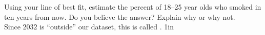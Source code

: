 \myWideProblem
{
    \small
    Using your line of best fit, estimate the percent of 18--25 year olds who smoked in ten years from now.
    Do you believe the answer? Explain why or why not.\\[0.5\onelineskip]
    Since $2032$ is ``outside'' our dataset, this is called .
}
{1in}